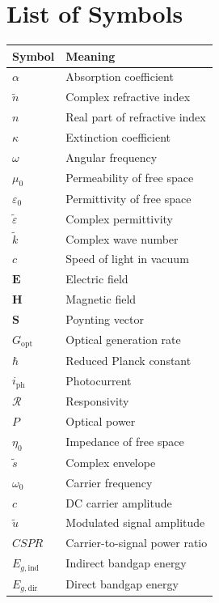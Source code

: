 \documentclass[12pt]{report}
\begin{document}
\chapter*{List of Symbols}
\begin{tabularx}{\textwidth}{L{0.18\textwidth} Y}
\toprule
Symbol & Meaning \\
\midrule
$\alpha$ & Absorption coefficient \\
$\tilde{n}$ & Complex refractive index \\
$n$ & Real part of refractive index \\
$\kappa$ & Extinction coefficient \\
$\omega$ & Angular frequency \\
$\mu_0$ & Permeability of free space \\
$\varepsilon_0$ & Permittivity of free space \\
$\tilde{\varepsilon}$ & Complex permittivity \\
$\tilde{k}$ & Complex wave number \\
$c$ & Speed of light in vacuum \\
$\mathbf{E}$ & Electric field \\
$\mathbf{H}$ & Magnetic field \\
$\mathbf{S}$ & Poynting vector \\
$G_{\mathrm{opt}}$ & Optical generation rate \\
$\hbar$ & Reduced Planck constant \\
$i_{\mathrm{ph}}$ & Photocurrent \\
$\mathcal{R}$ & Responsivity \\
$P$ & Optical power \\
$\eta_0$ & Impedance of free space \\
$\tilde{s}$ & Complex envelope \\
$\omega_0$ & Carrier frequency \\
$c$ & DC carrier amplitude \\
$\tilde{u}$ & Modulated signal amplitude \\
$CSPR$ & Carrier-to-signal power ratio \\
$E_{g,\mathrm{ind}}$ & Indirect bandgap energy \\
$E_{g,\mathrm{dir}}$ & Direct bandgap energy \\
\end{tabularx}
\cleardoublepage
{}

\printbibliography
\end{document}
